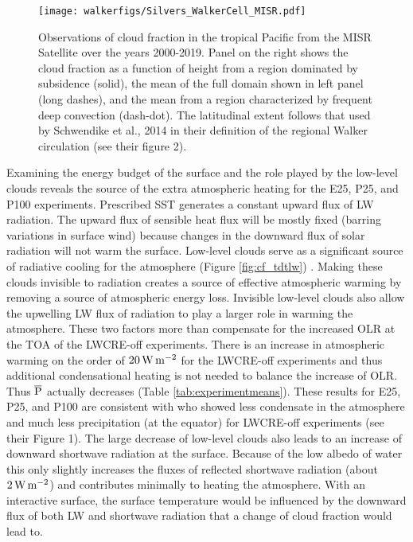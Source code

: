 \documentclass[draft]{agujournal2019}
\begin{document}
{\begin{figure}
  \centering
      \texttt{[image: walkerfigs/Silvers\_WalkerCell\_MISR.pdf]}
  \caption{Observations of cloud fraction in the tropical Pacific from the MISR Satellite over the years 2000-2019. Panel on the right shows the cloud 
  fraction as a function of height from a region dominated by subsidence (solid), the mean of the full domain shown in left panel 
  (long dashes), and the mean from a region characterized by frequent deep convection (dash-dot).  The latitudinal extent follows that used by Schwendike 
  et al., 2014 in their definition of the regional Walker circulation (see their figure 2).  }
  \label{fig:cf_misr}
\end{figure}

Examining the energy budget of the surface and the role played by the low-level clouds
reveals the source of the extra atmospheric heating for the E25, P25, and P100 experiments.  
Prescribed SST generates a constant upward flux of LW radiation.  
The upward flux of sensible heat flux will be mostly fixed (barring variations in surface
wind) because changes in the downward flux of solar radiation will not warm the surface.   
Low-level clouds  serve as a significant source of  radiative cooling for the atmosphere (Figure \ref{fig:cf_tdtlw}) .  
Making these clouds invisible to radiation creates a source of effective atmospheric warming by removing a source of atmospheric energy loss.  
Invisible low-level clouds also allow the upwelling LW flux of radiation to play a larger role in warming the atmosphere.
These two factors more than compensate for the increased OLR at the TOA of the LWCRE-off experiments.
There is an increase in atmospheric warming on the order of $20 \, \rm{W \,m^{-2}}$ for the LWCRE-off experiments and 
thus additional condensational heating is not needed to balance the increase of OLR. 
Thus $\overline{\rm{P}}$ actually decreases (Table \ref{tab:experimentmeans}).   
These results for E25, P25, and P100 are consistent with   who 
showed less condensate in the atmosphere and much less precipitation 
(at the equator) for LWCRE-off experiments (see their Figure 1).  
The large decrease of low-level clouds  also leads to an increase of downward shortwave radiation at the surface.  
Because of the low albedo of water this only slightly increases the fluxes of reflected shortwave radiation (about $2 \, \rm{W \,m^{-2}}$) 
and contributes minimally to heating the atmosphere.
With an interactive surface, the surface temperature would be influenced
by the downward flux of both LW and shortwave radiation that a change of cloud fraction would lead to.   


}
\end{document}
